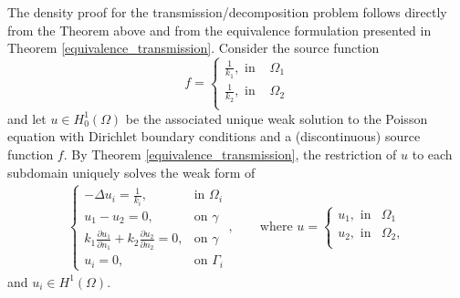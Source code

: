 The density proof for the transmission/decomposition problem follows directly from the Theorem above and from the equivalence formulation presented in Theorem \ref{equivalence_transmission}. Consider the source function
\begin{equation}
    f = \begin{cases}
        \frac{1}{k_1}, \text{ in } & \Omega_1\\
        \frac{1}{k_2}, \text{ in } & \Omega_2\\
    \end{cases}
\end{equation}
and let \(u \in H^1_0(\Omega)\) be the associated unique weak solution to the Poisson equation with Dirichlet boundary conditions and a (discontinuous) source function \(f\). By Theorem \ref{equivalence_transmission}, the restriction of \(u\) to each subdomain uniquely solves the weak form of
\begin{align}\label{transmission_restriction_equations_density}
    \begin{cases}
    - \Delta u_i = \frac{1}{k_i}, & \text{in }\Omega_i\\
    u_1 - u_2 = 0, & \text{on }\gamma\\
    k_1 \frac{\partial u_1}{\partial n_1} + k_2 \frac{\partial u_2}{\partial n_2} = 0, & \text{on }\gamma\\
    u_i = 0, & \text{on }\Gamma_i
    \end{cases}
    ,\qquad
    \text{where } 
    u = \begin{cases}
        u_1, \text{ in} & \Omega_1\\
        u_2, \text{ in} & \Omega_2,\\
    \end{cases}
\end{align}
and \(u_i \in H^1(\Omega)\).

